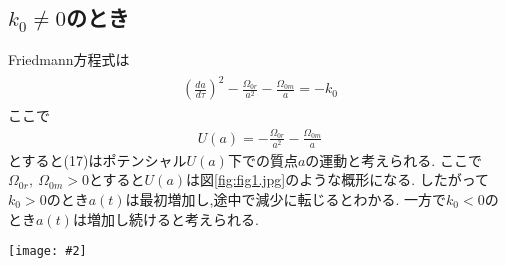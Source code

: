 \documentclass[uplatex,a4j,11pt,dvipdfmx]{jsarticle}
\makeatletter
\def\fgcaption{\def\@captype{figure}\caption}
\newcommand{\mfig}[3][width=15cm]{
\begin{center}
\texttt{[image: \#2]}
\fgcaption{#3 \label{fig:#2}}
\end{center}
}
\makeatother
\begin{document}
\subsection{$k_0\neq 0$のとき}
Friedmann方程式は
\begin{align}
  \begin{split}
    \left(\frac{da}{d\tau}\right)^2-\frac{\Omega_{0r}}{a^2}-\frac{\Omega_{0m}}{a}=-k_0
  \end{split}
\end{align}
ここで
\begin{align}
  U(a)=-\frac{\Omega_{0r}}{a^2}-\frac{\Omega_{0m}}{a}
\end{align}
とすると(17)はポテンシャル$U(a)$下での質点$a$の運動と考えられる.
ここで$\Omega_{0r},\ \Omega_{0m}>0$とすると$U(a)$は図\ref{fig:fig1.jpg}のような概形になる.
したがって$k_0>0$のとき$a(t)$は最初増加し,途中で減少に転じるとわかる.
一方で$k_0<0$のとき$a(t)$は増加し続けると考えられる.
\mfig[width=8cm]{fig1.jpg}{$U(a)$の概形}
\end{document}
